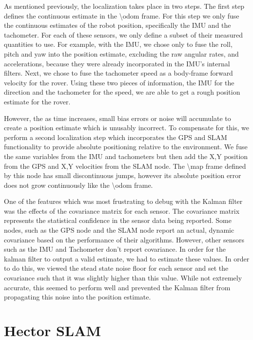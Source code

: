 As mentioned previously, the localization takes place in two steps. The first step defines the continuous estimate in the \textbackslash odom frame. For this step we only fuse the continuous estimates of the robot position, specifically the IMU and the tachometer. For each of these sensors, we only define a subset of their measured quantities to use. For example, with the IMU, we chose only to fuse the roll, pitch and yaw into the position estimate, excluding the raw angular rates, and accelerations, because they were already incorporated in the IMU's internal filters. Next, we chose to fuse the tachometer speed as a body-frame forward velocity for the rover. Using these two pieces of information, the IMU for the direction and the tachometer for the speed, we are able to get a rough position estimate for the rover. 

However, the as time increases, small bias errors or noise will accumulate to create a position estimate which is unusably incorrect. To compensate for this, we perform a second localization step which incorporates the GPS and SLAM functionality to provide absolute positioning relative to the environment. We fuse the same variables from the IMU and tachometers but then add the X,Y position from the GPS and X,Y velocities from the SLAM node. The \textbackslash map frame defined by this node has small discontinuous jumps, however its absolute position error does not grow continuously like the \textbackslash odom frame.

One of the features which was most frustrating to debug with the Kalman filter was the effects of the covariance matrix for each sensor. The covariance matrix represents the statistical confidence in the sensor data being reported. Some nodes, such as the GPS node and the SLAM node report an actual, dynamic covariance based on the performance of their algorithms. However, other sensors such as the IMU and Tachometer don't report covariance. In order for the kalman filter to output a valid estimate, we had to estimate these values. In order to do this, we viewed the stead state noise floor for each sensor and set the covariance such that it was slightly higher than this value. While not extremely accurate, this seemed to perform well and prevented the Kalman filter from propagating this noise into the position estimate.

\section{Hector SLAM}

